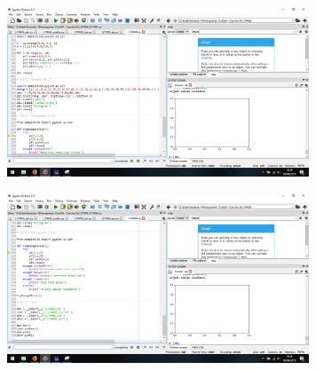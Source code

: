 \begin{figure}[H]
	\includegraphics[width=9cm]{figures/6/Praktek/1174039/c9.png}
	\centering
\end{figure}
\begin{figure}[H]
	\includegraphics[width=9cm]{figures/6/Praktek/1174039/c10.png}
	\centering
\end{figure}

